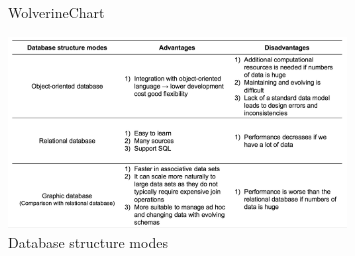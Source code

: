 \begin{figure}{WolverineChart}
	\begin{center}
		\includegraphics[width=0.8\textwidth]{WolverineChart2}
	\end{center}
	\caption{Database structure modes}
\end{figure}
\clearpage

